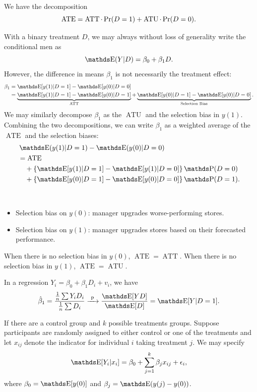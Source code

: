 \documentclass[letterpaper, 10pt]{article}
\DeclareMathOperator{\ATE}{ATE}
\DeclareMathOperator{\ATT}{ATT}
\DeclareMathOperator{\ATU}{ATU}
\begin{document}
\begin{proposition}
  We have the decomposition
  \[
    \ATE
    = \ATT \cdot \P(D = 1) + \ATU \cdot \P(D = 0).
  \]
\end{proposition}

With a binary treatment \(D\), we may always without loss of generality write the conditional men as
\[
  \E(Y|D)
  = \beta_0 + \beta_1 D.
\]
However, the difference in means \(\beta_1\) is not necessarily the treatment effect:
\begin{align*}
  \beta_1
  &= \E[y(1)|D = 1] - \E[y(0)|D = 0] \\
  &= \underbrace{\E[y(1)|D = 1] - \E[y(0)|D = 1]}_{\text{ATT}} + \underbrace{\E[y(0)| D = 1] - \E[y(0)|D = 0]}_{\text{Selection Bias}}.
\end{align*}
We may similarly decompose \(\beta_1\) as the \(\ATU\) and the selection bias in \(y(1)\).
Combining the two decompositions, we can write \(\beta_1\) as a weighted average of the \(\ATE\) and the selection biases:
\begin{align*}
  &\E(y(1)|D = 1) - \E(y(0)|D = 0) \\
  &= \ATE \\
  &\quad+ \left\{ \E[y(1)|D = 1] - \E[y(1)|D = 0] \right\} \Pr(D = 0) \\
  &\quad+ \left\{ \E[y(0)|D = 1] - \E[y(0)|D = 0] \right\} \Pr(D = 1).
\end{align*}

\begin{example}~
  \begin{itemize}
    \item Selection bias on \(y(0)\): manager upgrades worse-performing stores.
    \item Selection bias on \(y(1)\): manager upgrades stores based on their forecasted performance.
  \end{itemize}
  When there is no selection bias in \(y(0)\), \(\ATE = \ATT\).
  When there is no selection bias in \(y(1)\), \(\ATE = \ATU\).
\end{example}

\begin{example}
  In a regression \(Y_i = \beta_0 + \beta_1 D_i + v_i\), we have
  \[
    \hat{\beta}_1
    = \frac{\frac{1}{n} \sum Y_i D_i}{\frac{1}{n} \sum D_i}
    \longprobto \frac{\E[Y D]}{\E[D]}
    = \E[Y|D = 1].
  \]
\end{example}

\begin{example}
  If there are a control group and \(k\) possible treatments groups.
  Suppose participants are randomly assigned to either control or one of the treatments and let \(x_{i j}\) denote the indicator for individual \(i\) taking treatment \(j\).
  We may specify
  \[
    \E[Y_i|x_i] = \beta_0 + \sum_{j = 1}^k \beta_j x_{i j} + \epsilon_i,
  \]
  where \(\beta_0 = \E[y(0)]\) and \(\beta_j = \E(y(j) - y(0))\).
\end{example}
\end{document}

